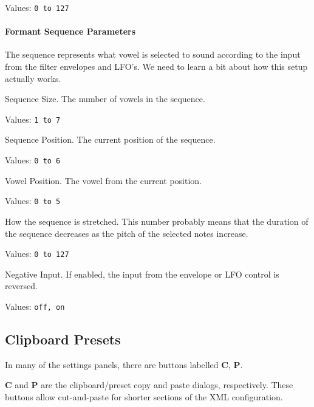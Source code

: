   Values:  \texttt{0 to 127}

\paragraph{Formant Sequence Parameters}
\label{paragraph:formant_sequence_parameters}

   The sequence represents what vowel is selected to sound according to the
   input from the filter envelopes and LFO's.
   We need to learn a bit about how this setup actually works.

   Sequence Size.
   The number of vowels in the sequence.

   Values:  \texttt{1 to 7}

   Sequence Position.
   The current position of the sequence.

   Values:  \texttt{0 to 6}

   Vowel Position.
   The vowel from the current position.

   Values:  \texttt{0 to 5}

   How the sequence is stretched.
   This number probably means that the duration of the sequence decreases as
   the pitch of the selected notes increase.

   Values:  \texttt{0 to 127}

   Negative Input.
   If enabled, the input from the envelope or LFO control is reversed.

   Values:  \texttt{off, on}

\subsection{Clipboard Presets}
\label{subsec:clipboard_presets}

   In many of the settings panels, there are buttons
   labelled \textbf{C}, \textbf{P}.


   \textbf{C} and \textbf{P} are the clipboard/preset copy and paste
   dialogs, respectively.
   These buttons allow cut-and-paste for shorter sections of the XML
   configuration.


